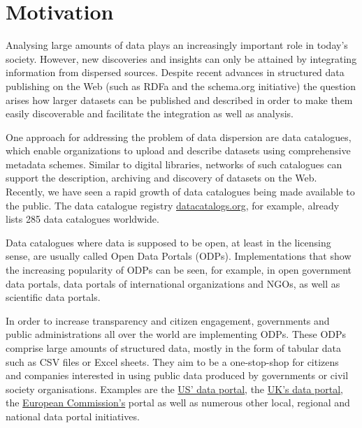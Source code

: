 \section{Motivation}

Analysing large amounts of data plays an increasingly important role in today's society. 
However, new discoveries and insights can only be attained by integrating information from dispersed sources. 
Despite recent advances in structured data publishing on the Web (such as RDFa and the schema.org initiative) the question arises how larger datasets can be published and described in order to make them easily discoverable and facilitate the integration as well as analysis.

One approach for addressing the problem of data dispersion are data catalogues, which enable organizations to upload and describe datasets using comprehensive metadata schemes. 
Similar to digital libraries, networks of such catalogues can support the description, archiving and discovery of datasets on the Web. 
Recently, we have seen a rapid growth of data catalogues being made available to the public. 
The data catalogue registry \href{http://datacatalogs.org}{datacatalogs.org}, for example, already lists 285 data catalogues worldwide. 

Data catalogues where data is supposed to be open, at least in the licensing sense, are usually called Open Data Portals (ODPs).
Implementations that show the increasing popularity of ODPs can be seen, for example, in open government data portals, data portals of international organizations and NGOs, as well as scientific data portals.

In order to increase transparency and citizen engagement, governments and public administrations all over the world are implementing ODPs. 
These ODPs comprise large amounts of structured data, mostly in the form of tabular data such as CSV files or Excel sheets. 
They aim to be a one-stop-shop for citizens and companies interested in using public data produced by governments or civil society organisations.
Examples are the \href{http://data.gov}{US' data portal}, the \href{http://data.gov.uk}{UK's data portal}, the \href{http://open-data.europa.eu}{European Commission's} portal as well as numerous other local, regional and national data portal initiatives.

